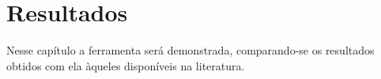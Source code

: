 \chapter{Resultados}

Nesse capítulo a ferramenta será demonstrada, comparando-se os resultados obtidos com ela àqueles disponíveis na literatura.
